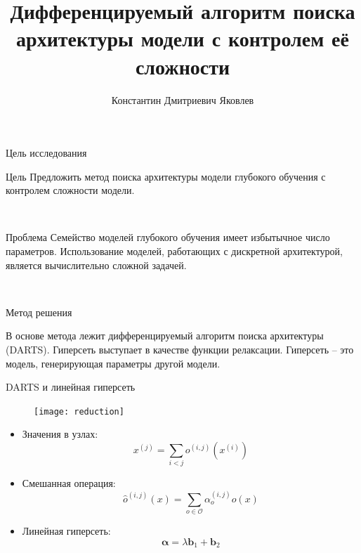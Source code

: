 \documentclass{beamer}
\title[\hbox to 56mm{Алгоритм поиска архитектуры}]{Дифференцируемый алгоритм поиска архитектуры модели с контролем её сложности}
\author[К.\,Д. Яковлев]{Константин Дмитриевич Яковлев}
\institute{Московский физико-технический институт}
\date{\footnotesize
\par\smallskip\emph{Курс:} Автоматизация научных исследований\par (практика, В.\,В.~Стрижов)/Группа 874
\par\smallskip\emph{Эксперт:} В.\,В.~Стрижов
\par\smallskip\emph{Консультант:} О.\,С.~Гребенькова, ~ О.\,Ю.~Бахтеев
\par\bigskip\small 2021}
\begin{document}
\begin{frame}
\thispagestyle{empty}
\maketitle
\end{frame}
\begin{frame}{Цель исследования}
\begin{block}{Цель} 
Предложить метод поиска архитектуры модели глубокого обучения с контролем сложности модели.
\end{block}

~\\
\begin{block}{Проблема}
Семейство моделей глубокого обучения имеет избытычное число параметров. Использование моделей, работающих с дискретной архитектурой, является вычислительно сложной задачей.
\end{block}
~\\
\begin{block}{Метод решения}

В основе метода лежит дифференцируемый алгоритм поиска архитектуры (DARTS). Гиперсеть выступает в качестве функции релаксации. Гиперсеть -- это модель, генерирующая параметры другой модели. 
\end{block}

\end{frame}
\begin{frame}{DARTS и линейная гиперсеть}


\begin{figure}
	\texttt{[image: reduction]}
\end{figure}


\begin{itemize}
\item Значения в узлах: $$x^{(j)} = \sum_{i < j}o^{(i, j)}(x^{(i)})$$

\item Смешанная операция: $$\hat{o}^{(i, j)}(x) = \sum_{o\in\mathcal{O}}\alpha^{(i, j)}_oo(x)$$

\item Линейная гиперсеть: $$\mathbf{\alpha} = \lambda\mathbf{b}_1 + \mathbf{b}_2$$

\end{itemize}


\end{frame}
\end{document}
